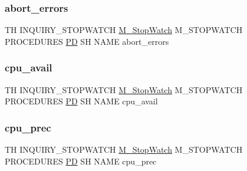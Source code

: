 \subsubsection{\texorpdfstring{abort\+\_\+errors}{abort\_errors}}
{\footnotesize\ttfamily TH I\+N\+Q\+U\+I\+R\+Y\+\_\+\+S\+T\+O\+P\+W\+A\+T\+CH \hyperlink{option__stopwatch_83_8txt_aa2011fc45a5e502e87ee50996a8a9305}{M\+\_\+\+Stop\+Watch} M\+\_\+\+S\+T\+O\+P\+W\+A\+T\+CH P\+R\+O\+C\+E\+D\+U\+R\+ES \hyperlink{what__overview_81_8txt_a85f26da5a4481fbdb0d9c79f2b94de3e}{PD} SH N\+A\+ME abort\+\_\+errors}

\mbox{\label{inquiry__stopwatch_83_8txt_a7abc42d907bf857b7ccd85e08a2698bf}} 
\subsubsection{\texorpdfstring{cpu\+\_\+avail}{cpu\_avail}}
{\footnotesize\ttfamily TH I\+N\+Q\+U\+I\+R\+Y\+\_\+\+S\+T\+O\+P\+W\+A\+T\+CH \hyperlink{option__stopwatch_83_8txt_aa2011fc45a5e502e87ee50996a8a9305}{M\+\_\+\+Stop\+Watch} M\+\_\+\+S\+T\+O\+P\+W\+A\+T\+CH P\+R\+O\+C\+E\+D\+U\+R\+ES \hyperlink{what__overview_81_8txt_a85f26da5a4481fbdb0d9c79f2b94de3e}{PD} SH N\+A\+ME cpu\+\_\+avail}

\mbox{\label{inquiry__stopwatch_83_8txt_a31483d611b443f67111f1154cd00fc7e}} 
\subsubsection{\texorpdfstring{cpu\+\_\+prec}{cpu\_prec}}
{\footnotesize\ttfamily TH I\+N\+Q\+U\+I\+R\+Y\+\_\+\+S\+T\+O\+P\+W\+A\+T\+CH \hyperlink{option__stopwatch_83_8txt_aa2011fc45a5e502e87ee50996a8a9305}{M\+\_\+\+Stop\+Watch} M\+\_\+\+S\+T\+O\+P\+W\+A\+T\+CH P\+R\+O\+C\+E\+D\+U\+R\+ES \hyperlink{what__overview_81_8txt_a85f26da5a4481fbdb0d9c79f2b94de3e}{PD} SH N\+A\+ME cpu\+\_\+prec}

\mbox{\label{inquiry__stopwatch_83_8txt_a3a3ade1e4c01a51287544ea767e3512a}} 
